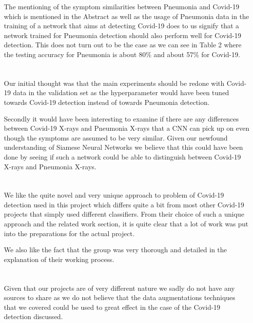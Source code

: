 \documentclass{article}
\begin{document}
The mentioning of the symptom similarities between Pneumonia and Covid-19 which is mentioned in the Abstract as well as the usage of Pneumonia data in the training of a network that aims at detecting Covid-19 does to us signify that a network trained for Pneumonia detection should also perform well for Covid-19 detection. This does not turn out to be the case as we can see in Table 2 where the testing accuracy for Pneumonia is about 80\% and about 57\% for Covid-19.

\section{}

Our initial thought was that the main experiments should be redone with Covid-19 data in the validation set as the hyperparameter would have been tuned towards Covid-19 detection instead of towards Pneumonia detection.

Secondly it would have been interesting to examine if there are any differences between Covid-19 X-rays and Pneumonia X-rays that a CNN can pick up on even though the symptoms are assumed to be very similar. Given our newfound understanding of Siamese Neural Networks we believe that this could have been done by seeing if such a network could be able to distinguish between Covid-19 X-rays and Pneumonia X-rays.

\section{}

We like the quite novel and very unique approach to problem of Covid-19 detection used in this project which differs quite a bit from most other Covid-19 projects that simply used different classifiers. From their choice of such a unique approach and the related work section, it is quite clear that a lot of work was put into the preparations for the actual project.

We also like the fact that the group was very thorough and detailed in the explanation of their working process. 

\section{}

Given that our projects are of very different nature we sadly do not have any sources to share as we do not believe that the data augmentations techniques that we covered could be used to great effect in the case of the Covid-19 detection discussed.
\end{document}
